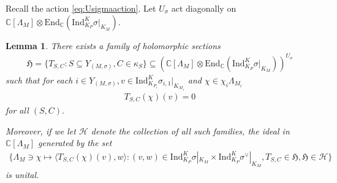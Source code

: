 \documentclass[10pt]{amsart}
\newtheorem{lemma}[theorem]{Lemma}
\theoremstyle{definition}
\numberwithin{equation}{section}
\numberwithin{equation}{subsection}
\newcommand{\Ind}{\mathrm{Ind}}
\newcommand{\CC}{\mathbb{C}}
\begin{document}
Recall the action \eqref{eq:Usigmaaction}. Let $U_\sigma$ act diagonally on $\CC[\Lambda_M]\otimes \mathrm{End}_\CC (\Ind_{K_P}^K \sigma|_{K_M})$.

\begin{lemma}\label{lem:varying}
    There exists a family of holomorphic sections 
    \begin{align*}
        \mathfrak{H}=\{T_{S,C}:S\subseteq Y_{(M,\sigma)}, C\in \kappa_S\}\subseteq \left(\CC[\Lambda_M]\otimes \mathrm{End}_\CC (\Ind_{K_P}^K \sigma|_{K_M})\right)^{U_\sigma}
    \end{align*}
    such that for each $i\in Y_{(M,\sigma)},  v\in \mathrm{Ind}_{K_{P_i}}^K \sigma_{i,1}|_{K_{M_i}}$ and $\chi\in \chi_i\Lambda_{M_i}$
    \begin{align*}
        T_{S,C}(\chi)(v)=0
    \end{align*}
    for all $(S,C).$ 
    
    Moreover, if we let $\mathcal{H}$ denote the collection of all such families, the ideal in $\CC[\Lambda_M]$ generated by the set 
    \begin{align*}
        \{\Lambda_{M}\ni \chi \mapsto \langle T_{S,C}(\chi)(v),w \rangle: (v,w)\in \mathrm{Ind}_{K_{P}}^K \sigma|_{K_M}\times \mathrm{Ind}_{K_{P}}^K \sigma^\lor|_{K_M}, T_{S,C}\in \mathfrak{H}, \mathfrak{H}\in \mathcal{H}\}
    \end{align*}
    is unital. 
\end{lemma}
\end{document}
